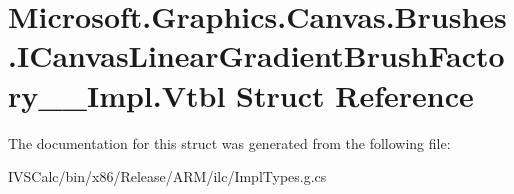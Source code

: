 \hypertarget{struct_microsoft_1_1_graphics_1_1_canvas_1_1_brushes_1_1_i_canvas_linear_gradient_brush_factory_____impl_1_1_vtbl}{}\section{Microsoft.\+Graphics.\+Canvas.\+Brushes.\+I\+Canvas\+Linear\+Gradient\+Brush\+Factory\+\_\+\+\_\+\+Impl.\+Vtbl Struct Reference}
\label{struct_microsoft_1_1_graphics_1_1_canvas_1_1_brushes_1_1_i_canvas_linear_gradient_brush_factory_____impl_1_1_vtbl}


The documentation for this struct was generated from the following file\+:\begin{DoxyCompactItemize}
\item 
I\+V\+S\+Calc/bin/x86/\+Release/\+A\+R\+M/ilc/Impl\+Types.\+g.\+cs\end{DoxyCompactItemize}
